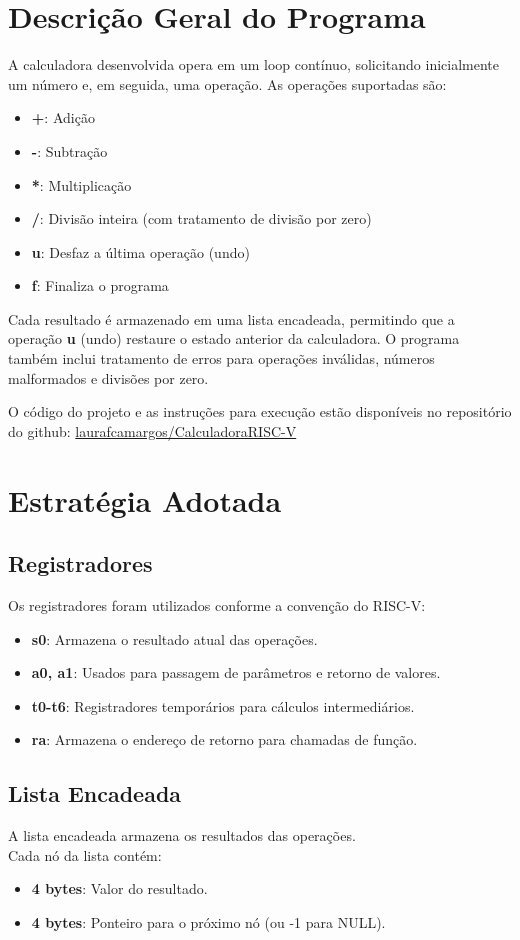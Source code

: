 \documentclass[12pt]{article}
\begin{document}
\section{Descrição Geral do Programa}
A calculadora desenvolvida opera em um loop contínuo, solicitando
inicialmente um número e, em seguida, uma operação. As operações suportadas são:
\begin{itemize}
	\item \textbf{+}: Adição
	\item \textbf{-}: Subtração
	\item \textbf{*}: Multiplicação
	\item \textbf{/}: Divisão inteira (com tratamento de divisão por zero)
	\item \textbf{u}: Desfaz a última operação (undo)
	\item \textbf{f}: Finaliza o programa
\end{itemize}

Cada resultado é armazenado em uma lista encadeada, permitindo que a
operação \textbf{u} (undo) restaure o estado anterior da calculadora.
O programa também inclui tratamento de erros para operações
inválidas, números malformados e divisões por zero.

O código do projeto e as instruções para execução estão disponíveis
no repositório do github: \href{https://github.com/laurafcamargos/CalculadoraRISC-V}{laurafcamargos/CalculadoraRISC-V}

\section{Estratégia Adotada}
\subsection{Registradores}
Os registradores foram utilizados conforme a convenção do RISC-V:
\begin{itemize}
	\item \textbf{s0}: Armazena o resultado atual das operações.
	\item \textbf{a0, a1}: Usados para passagem de parâmetros e retorno de valores.
	\item \textbf{t0-t6}: Registradores temporários para cálculos intermediários.
	\item \textbf{ra}: Armazena o endereço de retorno para chamadas de função.
\end{itemize}

\subsection{Lista Encadeada}
A lista encadeada armazena os resultados das operações.\\
Cada nó da lista contém:
\begin{itemize}
	\item \textbf{4 bytes}: Valor do resultado.
	\item \textbf{4 bytes}: Ponteiro para o próximo nó (ou -1 para NULL).
\end{itemize}
\end{document}
